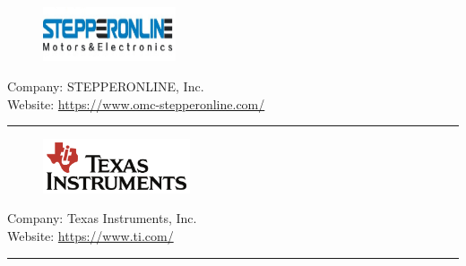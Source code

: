 \begin{figure}[h!]
\includegraphics[height=1.6cm]{Pictures/StepperonlineLogo.jpg}
\end{figure}
\vspace{3mm}
Company:  STEPPERONLINE, Inc.\\
Website: \url{https://www.omc-stepperonline.com/}
\vspace{5mm}
\hrule
\vspace{10mm}

\begin{figure}[h!]
\includegraphics[height=1.6cm]{Pictures/TexasInstruments-Logo.png}
\end{figure}
\vspace{3mm}
Company: Texas Instruments, Inc.\\
Website: \url{https://www.ti.com/}
\vspace{5mm}
\hrule
\vspace{10mm}

